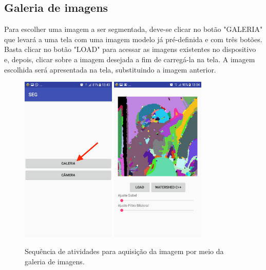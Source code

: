 \subsection{Galeria de imagens}

Para escolher uma imagem a ser segmentada, deve-se clicar no botão "GALERIA" que levará a uma tela com uma imagem modelo já pré-definida e com três botões. Basta clicar no botão "LOAD" para acessar as imagens existentes no dispositivo e, depois, clicar sobre a imagem desejada a fim de carregá-la na tela.
A imagem escolhida será apresentada na tela, substituindo a imagem anterior.
\begin{figure}[!htb]
 \centering
 \def\baselinestretch{1}\small\normalsize
 \includegraphics[width=0.4\textwidth]{img/galeria_app_n1.png}\qquad
 \includegraphics[width=0.4\textwidth]{img/galeria_app_n2.png} 
 \caption{\label{fig:galeria_app_p1}Sequência de atividades para aquisição da imagem por meio da galeria de imagens.}
\end{figure}
